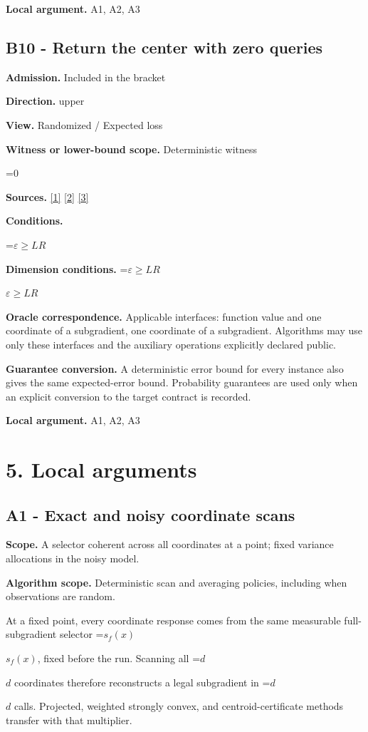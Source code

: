\documentclass[10pt,a4paper]{article}
\newcommand{\AtlasMath}[1]{\par\begingroup\centering\setbox0=\hbox{$\displaystyle #1$}\ifdim\wd0>1.4\linewidth\typeout{ATLAS WIDE FORMULA: \the\wd0}\fi\ifdim\wd0>\linewidth\resizebox{\linewidth}{!}{\box0}\else\box0\fi\par\endgroup}
\newcommand{\AtlasInlineMath}[1]{\begingroup\setbox0=\hbox{$#1$}\ifdim\wd0>.4\linewidth\endgroup\AtlasMath{#1}\else\endgroup$#1$\fi}
\begin{document}
\textbf{Local argument.} A1, A2, A3

\subsection{B10 - Return the center with zero queries}
\textbf{Admission.} Included in the bracket

\textbf{Direction.} upper

\textbf{View.} Randomized / Expected loss

\textbf{Witness or lower-bound scope.} Deterministic witness

\AtlasMath{0}
\textbf{Sources.} \href{https://arxiv.org/pdf/1405.4980}{[1]} \href{https://www2.isye.gatech.edu/~nemirovs/MOR_AccuracyCertificates.pdf}{[2]} \href{https://arxiv.org/pdf/2609.20701}{[3]}

\textbf{Conditions.} 
\AtlasMath{\varepsilon\ge LR}


\textbf{Dimension conditions.} \AtlasInlineMath{\varepsilon\ge LR}

\textbf{Oracle correspondence.} Applicable interfaces: function value and one coordinate of a subgradient, one coordinate of a subgradient. Algorithms may use only these interfaces and the auxiliary operations explicitly declared public.

\textbf{Guarantee conversion.} A deterministic error bound for every instance also gives the same expected-error bound. Probability guarantees are used only when an explicit conversion to the target contract is recorded.

\textbf{Local argument.} A1, A2, A3

\section{5. Local arguments}
\subsection{A1 - Exact and noisy coordinate scans}
\textbf{Scope.} A selector coherent across all coordinates at a point; fixed variance allocations in the noisy model.

\textbf{Algorithm scope.} Deterministic scan and averaging policies, including when observations are random.

At a fixed point, every coordinate response comes from the same measurable full-subgradient selector \AtlasInlineMath{s_f(x)}, fixed before the run. Scanning all \AtlasInlineMath{d} coordinates therefore reconstructs a legal subgradient in \AtlasInlineMath{d} calls. Projected, weighted strongly convex, and centroid-certificate methods transfer with that multiplier.
\end{document}
